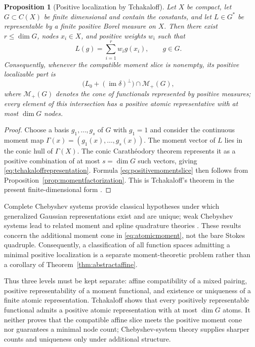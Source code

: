\documentclass[11pt,a4paper]{article}
\newtheorem{proposition}[theorem]{Proposition}
\theoremstyle{definition}
\theoremstyle{remark}
\newcommand{\im}{\operatorname{im}}
\begin{document}
\begin{proposition}[Positive localization by Tchakaloff]
\label{prop:tchakaloff}
Let $X$ be compact, let $G\subset C(X)$ be finite dimensional and contain the constants,
and let $L\in G^*$ be representable by a finite positive Borel measure on $X$.  Then there
exist $r\leq\dim G$, nodes $x_i\in X$, and positive weights $w_i$ such that
\begin{equation}\label{eq:tchakaloffrepresentation}
 L(g)=\sum_{i=1}^r w_i g(x_i),\qquad g\in G.
\end{equation}
Consequently, whenever the compatible moment slice is nonempty, its positive localizable
part is
\begin{equation}\label{eq:positivemomentslice}
 \bigl(L_0+(\im\delta)^\perp\bigr)\cap\mathcal M_+(G),
\end{equation}
where $\mathcal M_+(G)$ denotes the cone of functionals represented by positive measures;
every element of this intersection has a positive atomic representative with at most
$\dim G$ nodes.
\end{proposition}

\begin{proof}
Choose a basis $g_1,\ldots,g_s$ of $G$ with $g_1=1$ and consider the continuous moment map
$\Gamma(x)=(g_1(x),\ldots,g_s(x))$.  The moment vector of $L$ lies in the conic hull of
$\Gamma(X)$.  The conic Carath\'eodory theorem represents it as a positive combination of at
most $s=\dim G$ such vectors, giving \eqref{eq:tchakaloffrepresentation}.  Formula
\eqref{eq:positivemomentslice} then follows from
Proposition~\ref{prop:momentfactorization}.  This is Tchakaloff's theorem in the present
finite-dimensional form \cite{tchakaloff1957,bayerteichmann2006}.
\end{proof}

Complete Chebyshev systems provide classical hypotheses under which generalized Gaussian
representations exist and are unique; weak Chebyshev systems lead to related moment and
spline quadrature theories \cite{karlinstudden1966,gustafson1970,micchellipinkus1977,cheng1999}.
These results concern the additional moment cone in \eqref{eq:atomicmoment}, not the bare
Stokes quadruple.  Consequently, a classification of all function spaces admitting a
minimal positive localization is a separate moment-theoretic problem rather than a corollary
of Theorem~\ref{thm:abstractaffine}.

Thus three levels must be kept separate: affine compatibility of a mixed pairing, positive
representability of a moment functional, and existence or uniqueness of a finite atomic
representation.  Tchakaloff shows that every positively representable functional admits a
positive atomic representation with at most $\dim G$ atoms.  It neither proves that the
compatible affine slice meets the positive moment cone nor guarantees a minimal node count;
Chebyshev-system theory supplies sharper counts and uniqueness only under additional
structure.
\end{document}

